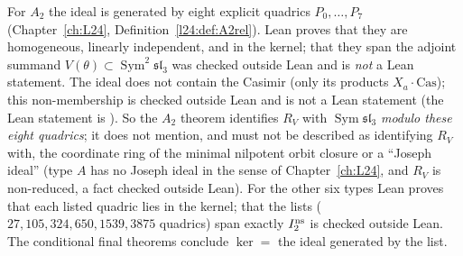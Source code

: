 \begin{warning}[title={What the relation lists are, and what Lean proves about them}]
For $A_2$ the ideal  is generated by eight explicit quadrics $P_0,\dots,P_7$ (Chapter~\ref{ch:L24},
Definition~\ref{l24:def:A2rel}). Lean proves that they are homogeneous, linearly independent, and in the kernel; that they
span the adjoint summand $V(\theta)\subset\operatorname{Sym}^2\mathfrak{sl}_3$ was checked outside Lean and is \emph{not} a Lean
statement. The ideal does not contain the Casimir (only its products $X_a\cdot\mathrm{Cas}$); this non-membership is checked outside Lean and is not a Lean statement (the Lean statement is ). So the $A_2$ theorem identifies $R_V$
with $\operatorname{Sym}\mathfrak{sl}_3$ \emph{modulo these eight quadrics}; it does not mention, and must not be described as
identifying $R_V$ with, the coordinate ring of the minimal nilpotent orbit closure or a ``Joseph ideal'' (type $A$ has no Joseph
ideal in the sense of Chapter~\ref{ch:L24}, and $R_V$ is non-reduced, a fact checked outside Lean). For the other six types Lean proves that each listed quadric
lies in the kernel; that the lists ($27,105,324,650,1539,3875$ quadrics) span exactly $I_2^{\mathrm{ns}}$ is checked outside Lean.
The conditional final theorems conclude $\ker=$ the ideal generated by the list.
\end{warning}

